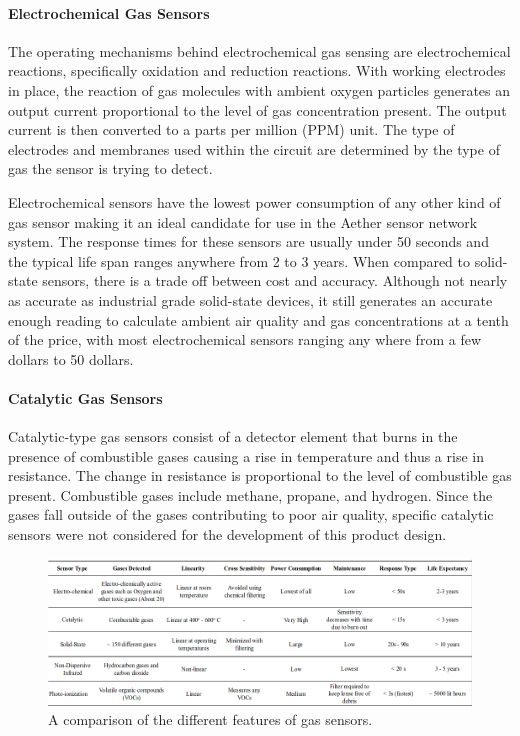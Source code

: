 \paragraph{Electrochemical Gas Sensors}
The operating mechanisms behind electrochemical gas sensing are electrochemical reactions, specifically oxidation and reduction reactions. With working electrodes in place, the reaction of gas molecules with ambient oxygen particles generates an output current proportional to the level of gas concentration present. The output current is then converted to a parts per million (PPM) unit. The type of electrodes and membranes used within the circuit are determined by the type of gas the sensor is trying to detect. 

Electrochemical sensors have the lowest power consumption of any other kind of gas sensor making it an ideal candidate for use in the Aether sensor network system. The response times for these sensors are usually under 50 seconds and the typical life span ranges anywhere from 2 to 3 years. When compared to solid-state sensors, there is a trade off between cost and accuracy. Although not nearly as accurate as industrial grade solid-state devices, it still generates an accurate enough reading to calculate ambient air quality and gas concentrations at a tenth of the price, with most electrochemical sensors ranging any where from a few dollars to 50 dollars. 
	
\paragraph{Catalytic Gas Sensors}
Catalytic-type gas sensors consist of a detector element that burns in the presence of combustible gases causing a rise in temperature and thus a rise in resistance. The change in resistance is proportional to the level of combustible gas present. Combustible gases include methane, propane, and hydrogen. Since the gases fall outside of the gases contributing to poor air quality, specific catalytic sensors were not considered for the development of this product design.

\begin{figure}
    \centering
    \includegraphics[width=6in]{figures/gas-sensor-comparison.png}
    \caption{A comparison of the different features of gas sensors.}
    \label{gas-sensor-comparison}
\end{figure}


